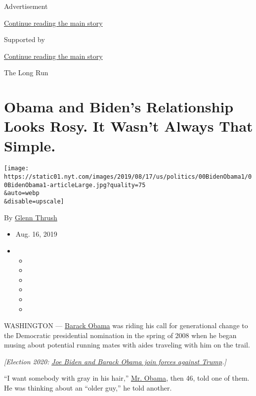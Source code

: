 Advertisement

\protect\hyperlink{after-top}{Continue reading the main story}

Supported by

\protect\hyperlink{after-sponsor}{Continue reading the main story}

The Long Run

\hypertarget{obama-and-bidens-relationship-looks-rosy-it-wasnt-always-that-simple}{%
\section{Obama and Biden's Relationship Looks Rosy. It Wasn't Always
That
Simple.}\label{obama-and-bidens-relationship-looks-rosy-it-wasnt-always-that-simple}}

\texttt{[image: https://static01.nyt.com/images/2019/08/17/us/politics/00BidenObama1/00BidenObama1-articleLarge.jpg?quality=75\\\&auto=webp\\\&disable=upscale]}

By \href{https://www.nytimes.com/by/glenn-thrush}{Glenn Thrush}

\begin{itemize}
\item
  Aug. 16, 2019
\item
  \begin{itemize}
  \item
  \item
  \item
  \item
  \item
  \item
  \end{itemize}
\end{itemize}

WASHINGTON ---
\href{https://www.nytimes.com/2020/07/23/arts/television/biden-obama-reunion-video.html}{Barack
Obama} was riding his call for generational change to the Democratic
presidential nomination in the spring of 2008 when he began musing about
potential running mates with aides traveling with him on the trail.

\emph{{[}Election 2020:}
\href{https://www.nytimes.com/2020/07/23/us/politics/barack-obama-joe-biden-video.html}{\emph{Joe
Biden and Barack Obama join forces against Trump}}\emph{.{]}}

``I want somebody with gray in his hair,''
\href{https://www.nytimes.com/2020/04/14/us/politics/obama-endorses-biden.html}{Mr.
Obama}, then 46, told one of them. He was thinking about an ``older
guy,'' he told another.

